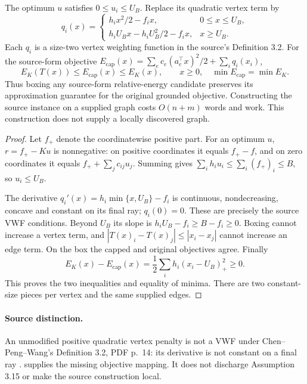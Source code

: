 \begin{lemma}
\label{lem:op3-capped-grounding-vwf}
The optimum $u$ satisfies $0\leq u_i\leq U_B$. Replace its quadratic
vertex term by
\begin{equation}
 q_i(x)=
 \begin{cases}
  h_i x^2/2-f_i x,&0\leq x\leq U_B,\\
  h_iU_Bx-h_iU_B^2/2-f_i x,&x\geq U_B.
 \end{cases}
 \label{eq:op3-capped-grounding-vwf}
\end{equation}
Each $q_i$ is a size-two vertex weighting function in the source's
Definition 3.2. For the source-form objective
$E_{\mathrm{cap}}(x)=\sum_e c_e(a_e^\top x)^2/2+\sum_i q_i(x_i)$,
\begin{equation}
 E_K(T(x))\leq E_{\mathrm{cap}}(x)\leq E_K(x),\qquad x\geq0,
 \quad \min E_{\mathrm{cap}}=\min E_K.
 \label{eq:op3-capped-grounding-equivalence}
\end{equation}
Thus boxing any source-form relative-energy candidate preserves its
approximation guarantee for the original grounded objective. Constructing
the source instance on a supplied graph costs $O(n+m)$ words and work.
This construction does not supply a locally discovered graph.
\end{lemma}
\begin{proof}
Let $f_+$ denote the coordinatewise positive part. For an optimum $u$,
$r=f_+-Ku$ is nonnegative: on positive coordinates it equals $f_+-f$,
and on zero coordinates it equals $f_++\sum_j c_{ij}u_j$.
Summing gives $\sum_i h_i u_i\leq\sum_i(f_+)_i\leq B$, so $u_i\leq U_B$.

The derivative $q_i'(x)=h_i\min\{x,U_B\}-f_i$ is continuous,
nondecreasing, concave and constant on its final ray; $q_i(0)=0$.
These are precisely the source VWF conditions. Beyond $U_B$ its slope
is $h_iU_B-f_i\geq B-f_i\geq0$. Boxing cannot increase a vertex term,
and $|T(x)_i-T(x)_j|\leq|x_i-x_j|$ cannot increase an edge term.
On the box the capped and original objectives agree. Finally
\[
 E_K(x)-E_{\mathrm{cap}}(x)
 =\frac12\sum_i h_i(x_i-U_B)_+^2\geq0.
\]
This proves the two inequalities and equality of minima. There are two
constant-size pieces per vertex and the same supplied edges.
\end{proof}

\paragraph{Source distinction.}
An unmodified positive quadratic vertex penalty is not a VWF under
Chen--Peng--Wang's Definition 3.2, PDF p.\ 14: its derivative is not
constant on a final ray \citep{chen2021diffusion}.
 supplies the missing objective mapping.
It does not discharge Assumption 3.15 or make the source construction local.

